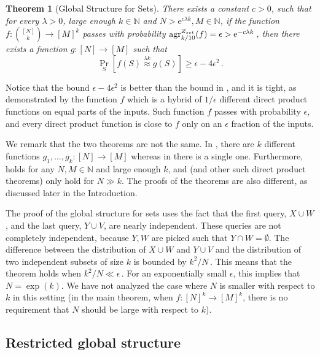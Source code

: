 \documentclass[11pt]{article}
\numberwithin{equation}{section}
\newtheorem{theorem}{Theorem}[section]
\theoremstyle{definition}
\theoremstyle{plain}
\newcommand{\eee}{\mathrm e}
\newcommand{\Prob}[2][]{\Pr_{{#1}}\left[#2\right]} %
\newcommand\f{f} %
\newcommand\pf{g} %
\newcommand{\test}[2]{
	\ifx &#2&
	\textrm{agr}^{#1}
	\else	
	\textrm{agr}^{#1}_{#2}
	\fi}
\newcommand\neql[1]{\stackrel{{#1}}{ \approx}} %
\newcommand{\sets}{\binom{[N]}{k}} %
\begin{document}
\begin{theorem}[Global Structure for Sets]\label{thm:global structure for sets}
There exists a %
constant $c>0$, such that for every %
%
%
$\lambda>0$, large enough $k\in\mathbb{N}$ and $N > \eee^{c\lambda k},M\in\mathbb{N}$, if the function $\f:\sets\rightarrow[M]^k$ passes  with probability $\test{Z_{set}}{k/10}(f)=\epsilon > \eee^{-c\lambda k}$\,, then there exists a function $\pf:[N]\rightarrow[M]$ such that
\[ \Prob[S]{\f(S)\neql{\lambda k}\pf(S)} \geq \epsilon - 4\epsilon^2 \,.\] %
\end{theorem}
Notice that the bound $\epsilon - 4\epsilon^2$ is better than the bound in , and it is tight, %
as demonstrated by the function $\f$ which is a hybrid of 
%
%
%
$1/\epsilon$ %
different direct product functions on %
equal  %
parts of the inputs. Such function $\f$ passes  with probability $\epsilon$, and every direct product function is close to $\f$ only on an $\epsilon$ fraction of the inputs.

We remark that the two theorems are not the same. In , there are $k$ different functions $\pf_1,\ldots,\pf_k:[N]\rightarrow[M]$ whereas in  there is a single one. Furthermore,  holds for any $N,M\in \mathbb{N}$ and large enough $k$, and  (and other such direct product theorems) only %
hold  %
for $N\gg k$. 
The proofs of the theorems are also different, %
as  %
discussed later in the %
Introduction.  %

The proof of the global structure for sets uses the fact that the first query, $X\cup W$, and the last query, $Y\cup V$, are nearly independent. These queries are not completely independent, because $Y,W$ are picked such that $Y\cap W=\emptyset$. The difference between the distribution of $X\cup W$ and $Y\cup V$ and the distribution of two independent subsets of size $k$ is bounded by $k^2/N$\,. %
%
%
%
This means that the theorem holds when %
%
$k^2/N\ll \epsilon$\,. %
For an exponentially small $\epsilon$, this implies that $N = \exp(k)$. We have not analyzed the case where $N$ is smaller with respect to $k$ in this setting 
%
(in the main theorem, when $f:[N]^k\rightarrow[M]^k$, there is no requirement that $N$ should be large with respect to $k$). %
%
%
%
\subsection{Restricted global structure}
%
\end{document}
